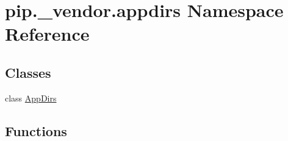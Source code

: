 \hypertarget{namespacepip_1_1__vendor_1_1appdirs}{}\section{pip.\+\_\+vendor.\+appdirs Namespace Reference}
\label{namespacepip_1_1__vendor_1_1appdirs}
\subsection*{Classes}
\begin{DoxyCompactItemize}
\item 
class \hyperlink{classpip_1_1__vendor_1_1appdirs_1_1AppDirs}{App\+Dirs}
\end{DoxyCompactItemize}
\subsection*{Functions}
